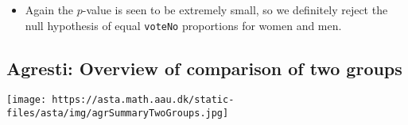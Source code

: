\documentclass[]{article}
\providecommand{\tightlist}{%
  \setlength{\itemsep}{0pt}\setlength{\parskip}{0pt}}
\begin{document}
\begin{itemize}
\tightlist
\item
  Again the \(p\)-value is seen to be extremely small, so we definitely
  reject the null hypothesis of equal \texttt{voteNo} proportions for
  women and men.
\end{itemize}

\subsection{Agresti: Overview of comparison of two
groups}\label{agresti-overview-of-comparison-of-two-groups}

\texttt{[image: https://asta.math.aau.dk/static-files/asta/img/agrSummaryTwoGroups.jpg]}
\end{document}
